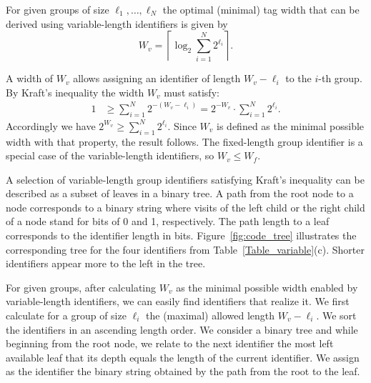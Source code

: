 \begin{property}
For given groups of size $\ell_1, \ldots, \ell_N$ the optimal (minimal) tag width that can be derived using variable-length identifiers is given by 
\begin{equation} \label{eq2}
W_{v}  = \left \lceil \log_2 \sum_{i = 1}^{N}{2^{\ell_i}} \right \rceil. \nonumber 
\end{equation}
\label{property_variable_length_minimal_tag}
\end{property} 
\bp A width of $W_{v}$ allows assigning an identifier of length $W_{v}
- \ell_i$ to the $i$-th group. By Kraft's inequality the width $W_{v}$
must satisfy:
\begin{equation} \label{eq1}
\begin{split}
1 &\ge \sum_{i = 1}^{N}{2^{-(W_{v}-\ell_i)}} = 2^{-W_{v}} \cdot \sum_{i = 1}^{N}{2^{\ell_i}}. \nonumber 
\end{split}
\end{equation}
Accordingly we have $2^{W_{v}}  \ge \sum_{i = 1}^{N}{2^{\ell_i}}$. Since $W_{v}$ is defined as the minimal possible width with that property, the result follows.
\ep
\noindent
The fixed-length group identifier is a special case of the
variable-length identifiers, so $W_{v} \le W_{f}$.

A selection of variable-length group identifiers satisfying Kraft's inequality can be described as a subset of leaves in a binary tree. 
A path from the root node to a node corresponds to a binary string where visits of the left child or the right child of a node stand for bits of 0 and 1, respectively. 
The path length  to a leaf corresponds to the identifier length in bits.
Figure~\ref{fig:code_tree} illustrates the corresponding tree for the four identifiers from Table~\ref{Table_variable}(c).
Shorter identifiers appear more to the left in the tree.

For given groups, after calculating $W_{v}$ as the minimal possible width enabled by variable-length identifiers, we can easily find identifiers that realize it. We first calculate for a group of size $\ell_i$ the (maximal) allowed length $W_{v} - \ell_i$. We sort the identifiers in an ascending length order. We consider a binary tree and while beginning from the root node, we relate to the next identifier the most left available leaf that its depth equals the length of the current identifier. We assign as the identifier the binary string obtained by the path from the root to the leaf.
 
